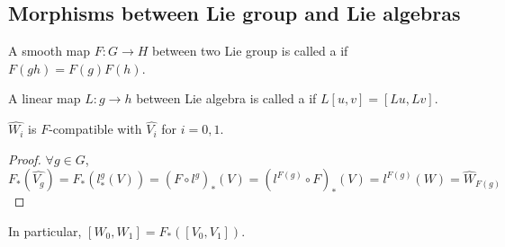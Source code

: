 \subsection{Morphisms between Lie group and Lie algebras}
A smooth map  $ F:G\rightarrow H $ between two Lie group is called a  if  $ F(gh)=F(g)F(h) $.

A linear map  $ L:g\rightarrow h$ between Lie algebra is called a  if  $ L[u,v]=[Lu,Lv] $. 
\begin{claim}
     $ \hat{W_i} $ is  $ F $-compatible with  $ \hat{V_i} $ for  $ i=0,1 $.    
\end{claim}
\begin{proof}
     $ \forall g\in G $,  $ F_*(\hat{V_g})=F_*(l_*^g(V))=(F\circ l^g)_*(V)=(l^{F(g)}\circ F)_*(V)=l^{F(g)}(W)=\hat{W}_{F(g)} $  
\end{proof}
In particular,  $ [W_0,W_1]=F_*([V_0,V_1]) $. 